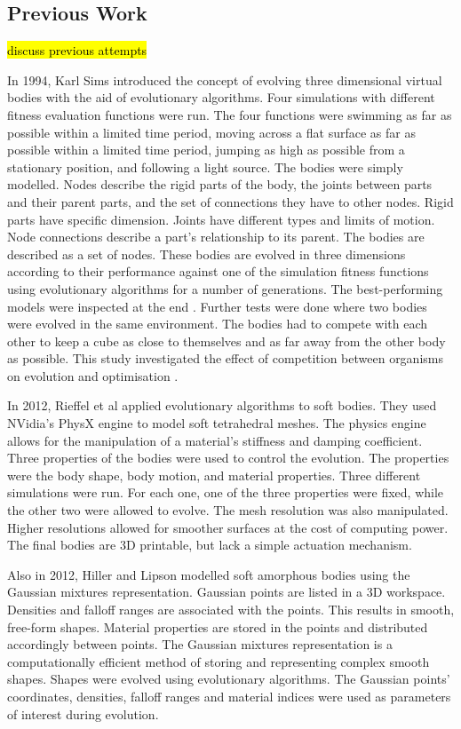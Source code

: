 \subsection{Previous Work}

\hl{discuss previous attempts}

In 1994, Karl Sims introduced the concept of evolving three dimensional virtual bodies with the aid of evolutionary algorithms. Four simulations with different fitness evaluation functions were run. The four functions were swimming as far as possible within a limited time period, moving across a flat surface as far as possible within a limited time period, jumping as high as possible from a stationary position, and following a light source. The bodies were simply modelled. Nodes describe the rigid parts of the body, the joints between parts and their parent parts, and the set of connections they have to other nodes. Rigid parts have specific dimension. Joints have different types and limits of motion. Node connections describe a part's relationship to its parent. The bodies are described as a set of nodes. These bodies are evolved in three dimensions according to their performance against one of the simulation fitness functions using evolutionary algorithms for a number of generations. The best-performing models were inspected at the end \cite{Sims1994a}. Further tests were done where two bodies were evolved in the same environment. The bodies had to compete with each other to keep a cube as close to themselves and as far away from the other body as possible. This study investigated the effect of competition between organisms on evolution and optimisation \cite{Sims1994b}.

In 2012, Rieffel et al applied evolutionary algorithms to soft bodies. They used NVidia's PhysX engine to model soft tetrahedral meshes. The physics engine allows for the manipulation of a material's stiffness and damping coefficient. Three properties of the bodies were used to control the evolution. The properties were the body shape, body motion, and material properties. Three different simulations were run. For each one, one of the three properties were fixed, while the other two were allowed to evolve. The mesh resolution was also manipulated. Higher resolutions allowed for smoother surfaces at the cost of computing power. The final bodies are 3D printable, but lack a simple actuation mechanism. \cite{Rieffel2013}

Also in 2012, Hiller and Lipson modelled soft amorphous bodies using the Gaussian mixtures representation. Gaussian points are listed in a 3D workspace. Densities and falloff ranges are associated with the points. This results in smooth, free-form shapes. Material properties are stored in the points and distributed accordingly between points. The Gaussian mixtures representation is a computationally efficient method of storing and representing complex smooth shapes. Shapes were evolved using evolutionary algorithms. The Gaussian points' coordinates, densities, falloff ranges and material indices were used as parameters of interest during evolution.\cite{Hiller2012}

